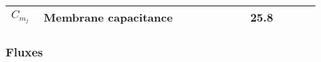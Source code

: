 \begin{table}[h!]
\centering
\begin{tabular}{| p{0.09\linewidth} | >{\footnotesize} p{0.6\linewidth} | >{\footnotesize} p{0.17\linewidth} | >{\footnotesize} p{0.02\linewidth} |}
\arrayrulecolor{lightgrey}\hline
 $C_{m_{j}}$				& Membrane capacitance												& 25.8  \pF		& \cite{Koenigsberger2006} \\
 
\hline
\end{tabular}
\label{tab:CIP3j}
\end{table}

\subsubsection{Fluxes}
%
